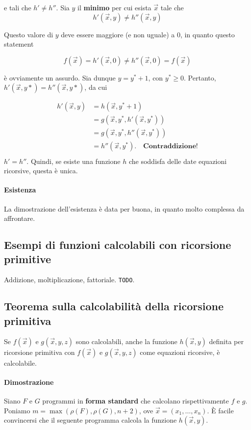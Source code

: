 	e tali che $h' \neq h''$. Sia $y$ il \textbf{minimo} per cui esista $\vec{x}$ tale che 
	$$
	h'(\vec{x},y) \neq h''(\vec{x}, y)
	$$
	
	Questo valore di $y$ deve essere maggiore (e non uguale) a 0, in quanto questo statement
	
	$$
	f(\vec{x}) = h'(\vec{x}, 0) \neq h''(\vec{x}, 0) = f(\vec{x})
	$$
	
	è ovviamente un assurdo. Sia dunque $y = y^*+1$, con $y^* \geq 0$. Pertanto, $h'(\vec{x}, y*) = h''(\vec{x}, y*)$, da cui
	
\begin{align*}
	h'(\vec{x}, y) &= h(\vec{x}, y^*+1)\\ 
	&= g(\vec{x}, y^*, h'(\vec{x}, y^*))\\ 
	&= g(\vec{x}, y^*, h''(\vec{x}, y^*))\\ 
	&= h''(\vec{x}, y^*). \quad \textbf{Contraddizione!}\\ 
\end{align*}
$h' = h''$. 
Quindi, se esiste una funzione $h$ che soddisfa delle date equazioni ricorsive, questa è unica.
	
	
	\paragraph{Esistenza} La dimostrazione dell'esistenza è data per buona, in quanto molto complessa da affrontare.
	
	\subsection{Esempi di funzioni calcolabili con ricorsione primitive}
	
	Addizione, moltiplicazione, fattoriale. \verb|TODO|.
	
	\subsection{Teorema sulla calcolabilità della ricorsione primitiva}
	Se $f(\vec{x})$ e $g(\vec{x}, y, z)$ sono calcolabili, anche la funzione $h(\vec{x},y)$  definita per ricorsione primitiva con $f(\vec{x})$ e $g(\vec{x},y,z)$ come equazioni ricorsive, è calcolabile.
	
	\paragraph{Dimostrazione} Siano $F$ e $G$ programmi in \textbf{forma standard} che calcolano rispettivamente $f$ e $g$. 
	Poniamo $m=\max(\rho(F), \rho(G), n+2)$, ove $\vec{x}=(x_1, \dots, x_n)$. È facile convincersi che il seguente programma calcola la funzione $h(\vec{x}, y)$.
	
